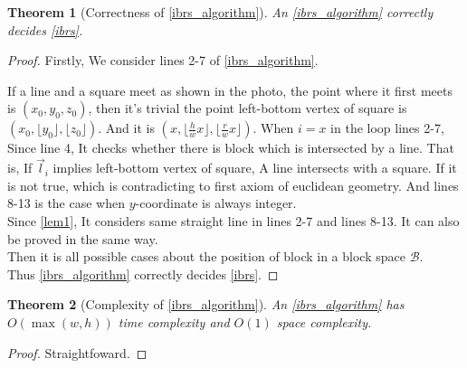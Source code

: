 \documentclass{article}
\newtheorem{theorem}{Theorem}
\begin{document}
\begin{theorem}[Correctness of \cref{ibrs_algorithm}]
    An \cref{ibrs_algorithm} correctly decides \cref{ibrs}.
\end{theorem}
\begin{proof}
    Firstly, We consider lines 2-7 of \cref{ibrs_algorithm}.
    \begin{center}
    \end{center}
    If a line and a square meet as shown in the photo, the point where it first meets is $(x_{0},y_{0},z_{0})$, 
    then it's trivial the point left-bottom vertex of square is $(x_{0},\lfloor y_{0} \rfloor,\lfloor z_{0} \rfloor)$.
    And it is $(x, \lfloor \frac{h}{w} x \rfloor, \lfloor \frac{r}{w} x \rfloor)$. 
    When $i=x$ in the loop lines 2-7, Since line 4, It checks whether there is block which is intersected by a line.
    That is, If $\vec{l}_{i}$ implies left-bottom vertex of square, A line intersects with a square.
    If it is not true, which is contradicting to first axiom of euclidean geometry.
    And lines 8-13 is the case when $y$-coordinate is always integer. \\
    Since \cref{lem1}, It considers same straight line in lines 2-7 and lines 8-13.
    It can also be proved in the same way. \\
    Then it is all possible cases about the position of block in a block space $\mathcal{B}$. \\
    Thus \cref{ibrs_algorithm} correctly decides \cref{ibrs}.
\end{proof}
\begin{theorem}[Complexity of \cref{ibrs_algorithm}]
    An \cref{ibrs_algorithm} has $O(\max(w,h))$ time complexity and $O(1)$ space complexity.
\end{theorem}
\begin{proof}
    Straightfoward.
\end{proof}
\end{document}
